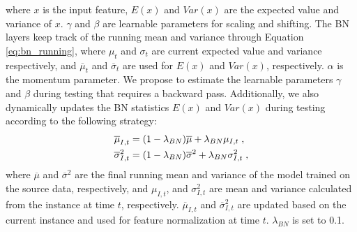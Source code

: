 where $x$ is the input feature, $E(x)$ and $Var(x)$ are the expected value and variance of $x$. $\gamma$ and $\beta$ are learnable parameters for scaling and shifting. The BN layers keep track of the running mean and variance through Equation \ref{eq:bn_running}, where ${\mu}_t$ and ${\sigma}_{t}$ are current expected value and variance respectively, and $\overline{\mu}_t$ and $\overline{\sigma}_{t}$ are used for $E(x)$ and $Var(x)$, respectively. $\alpha$ is the momentum parameter. We propose to estimate the learnable parameters $\gamma$ and $\beta$ during testing that requires a backward pass. Additionally, we also dynamically updates the BN statistics $E(x)$ and $Var(x)$ during testing according to the following strategy:
\begin{equation}
  \centering
  \label{eq:bn_update}
      \begin{aligned}  
          \overline{\mu}_{I,t} &= (1-\lambda{_{BN}}) \overline{\mu} +  \lambda{_{BN}} \mu_{I,t} \; ,\\
          \overline{\sigma}_{I,t}^2 &= (1-\lambda{_{BN}}) \overline{\sigma}^2 +  \lambda{_{BN}} \sigma_{I,t}^2 \; ,
      \end{aligned}
\end{equation}
where $\overline{\mu}$ and $\overline{\sigma}^2$ are the final running mean and variance of the model trained on the source data, respectively, and $\mu_{I,t}$, and $\sigma_{I,t}^2$ are mean and variance calculated from the instance at time $t$, respectively. $\overline{\mu}_{I,t}$ and $\overline{\sigma}_{I,t}^2$ are updated based on the current instance and used for feature normalization at time $t$. $ \lambda{_{BN}}$ is set to 0.1. 
